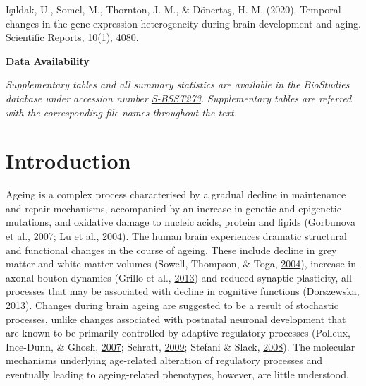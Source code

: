 \documentclass[12pt,twoside]{unicam}
\begin{document}
Işıldak, U., Somel, M., Thornton, J. M., \& Dönertaş, H. M. (2020). Temporal changes in the gene expression heterogeneity during brain development and aging. Scientific Reports, 10(1), 4080.

\textbf{Data Availability}

\emph{Supplementary tables and all summary statistics are available in the BioStudies database under accession number \href{https://www.ebi.ac.uk/biostudies/studies/S-BSST273}{S-BSST273}. Supplementary tables are referred with the corresponding file names throughout the text.}
\normalsize

\hypertarget{introduction-1}{%
\section{Introduction}\label{introduction-1}}

Ageing is a complex process characterised by a gradual decline in maintenance and repair mechanisms, accompanied by an increase in genetic and epigenetic mutations, and oxidative damage to nucleic acids, protein and lipids (Gorbunova et al., \protect\hyperlink{ref-Gorbunova2007}{2007}; Lu et al., \protect\hyperlink{ref-Lu2004}{2004}). The human brain experiences dramatic structural and functional changes in the course of ageing. These include decline in grey matter and white matter volumes (Sowell, Thompson, \& Toga, \protect\hyperlink{ref-Sowell2004}{2004}), increase in axonal bouton dynamics (Grillo et al., \protect\hyperlink{ref-Grillo2013}{2013}) and reduced synaptic plasticity, all processes that may be associated with decline in cognitive functions (Dorszewska, \protect\hyperlink{ref-Dorszewska2013}{2013}). Changes during brain ageing are suggested to be a result of stochastic processes, unlike changes associated with postnatal neuronal development that are known to be primarily controlled by adaptive regulatory processes (Polleux, Ince-Dunn, \& Ghosh, \protect\hyperlink{ref-Polleux2007}{2007}; Schratt, \protect\hyperlink{ref-Schratt2009}{2009}; Stefani \& Slack, \protect\hyperlink{ref-Stefani2008}{2008}). The molecular mechanisms underlying age-related alteration of regulatory processes and eventually leading to ageing-related phenotypes, however, are little understood.
\end{document}
